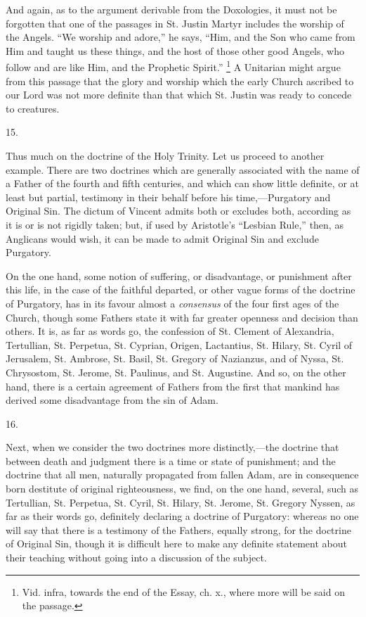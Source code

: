 And again, as to the argument derivable from the
Doxologies, it must not be forgotten that one of the
passages in St. Justin Martyr includes the worship of the
Angels. ``We worship and adore,'' he says,
``Him, and the Son who came from Him and taught us
these things, and the host of those other good Angels,
who follow and are like Him, and the Prophetic
Spirit.'' \footnote{Vid. infra, towards the end
of the Essay, ch. x., where more will be said on the
passage.} A Unitarian might argue from this passage that
the glory and worship which the early Church ascribed to
our Lord was not more definite than that which St. Justin
was ready to concede to creatures.

15.

Thus much on the doctrine of the Holy Trinity. Let us
proceed to another example. There are two doctrines which
are generally associated with the name of a Father of the
fourth and fifth centuries, and which can show little
definite, or at least but partial, testimony in their
behalf before his time,—Purgatory and Original Sin.
The dictum of Vincent admits both or excludes both,
according as it is or is not rigidly taken; but, if used
by Aristotle's ``Lesbian Rule,'' then, as
Anglicans would wish, it can be made to admit Original
Sin and exclude Purgatory.

On the one hand, some notion of suffering, or
disadvantage, or punishment after this life, in the case
of the faithful departed, or other vague forms of the
doctrine of Purgatory, has in its favour almost a \emph{consensus}
of the four first ages of the Church, though some Fathers
state it with far greater openness and decision than
others. It is, as far as words go, the confession of St.
Clement of Alexandria, Tertullian, St. Perpetua, St.
Cyprian, Origen, Lactantius, St. Hilary, St. Cyril of
Jerusalem, St. Ambrose, St. Basil, St. Gregory of
Nazianzus, and of Nyssa, St. Chrysostom, St. Jerome, St.
Paulinus, and St. Augustine. And so, on the other hand,
there is a certain agreement of Fathers from the first
that mankind has derived some disadvantage from the sin
of Adam.

16.

Next, when we consider the two doctrines more
distinctly,—the doctrine that between death and
judgment there is a time or state of punishment; and the
doctrine that all men, naturally propagated from fallen
Adam, are in consequence born destitute of original
righteousness, we find, on the one hand, several, such as
Tertullian, St. Perpetua, St. Cyril, St. Hilary, St.
Jerome, St. Gregory Nyssen, as far as their words go,
definitely declaring a doctrine of Purgatory: whereas no
one will say that there is a testimony of the Fathers,
equally strong, for the doctrine of Original Sin, though
it is difficult here to make any definite statement about
their teaching without going into a discussion of the
subject.


